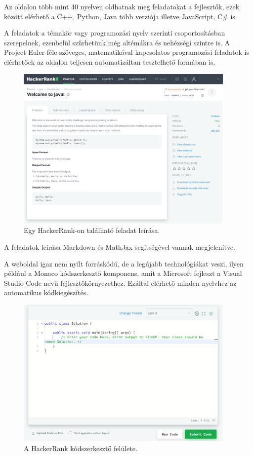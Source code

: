 Az oldalon több mint 40 nyelven oldhatnak meg feladatokat a fejlesztők, ezek között elérhető a C++, Python, Java több verziója illetve JavaScript, C\# is. \cite{hackerrank_environment}

A feladatok a témakör vagy programozási nyelv szerinti csoportosításban szerepelnek, ezenbelül szűrhetünk még altémákra és nehézségi szintre is. A Project Euler-féle szöveges, matematikával kapcsolatos programozási feladatok is elérhetőek az oldalon teljesen automatizáltan tesztelhető formában is.

\begin{figure}[h]
    \centering
    \includegraphics[width=0.95\textwidth]{images/hackerrank_task.png}
    \caption{Egy HackerRank-on található feladat leírása.}
    \label{fig:exercism_task}
\end{figure}

A feladatok leírása Markdown és MathJax segítségével vannak megjelenítve.

A weboldal igaz nem nyílt forráskódú, de a legújabb technológiákat veszi, ilyen például a Monaco kódszerkesztő komponens, amit a Microsoft fejleszt a Visual Studio Code nevű fejlesztőkörnyezethez. Ezáltal elérhető minden nyelvhez az automatikus kódkiegészítés.

\begin{figure}[h]
    \centering
    \includegraphics[width=0.95\textwidth]{images/hackerrank_editor.png}
    \caption{A HackerRank kódszerkesztő felülete.}
    \label{fig:hackerrank_editor}
\end{figure}

